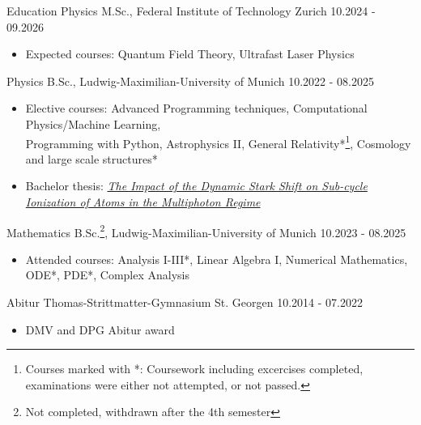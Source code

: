 \documentclass{resume}
\begin{document}
\begin{rSection}{Education}
    Physics M.Sc., Federal Institute of Technology Zurich \hfill 10.2024 - 09.2026
    \begin{itemize}\footnotesize
        \item Expected courses: Quantum Field Theory, Ultrafast Laser Physics
    \end{itemize}

    Physics B.Sc., Ludwig-Maximilian-University of Munich \hfill 10.2022 - 08.2025
    \begin{itemize}\footnotesize
        \item Elective courses: Advanced Programming techniques, Computational Physics/Machine Learning,\\Programming with Python, Astrophysics II, General Relativity*\footnote{Courses marked with *: Coursework including excercises completed, examinations were either not attempted, or not passed.}, Cosmology and large scale structures*
        \item Bachelor thesis: \textit{\href{https://doi.org/10.5281/zenodo.16223179}{The Impact of the Dynamic Stark Shift on Sub-cycle Ionization of Atoms in the Multiphoton Regime}}
    \end{itemize}

    Mathematics B.Sc.\footnote{Not completed, withdrawn after the 4th semester}, Ludwig-Maximilian-University of Munich \hfill 10.2023 - 08.2025
    \begin{itemize}\footnotesize
        \item Attended courses: Analysis I-III*, Linear Algebra I, Numerical Mathematics, \\ODE*, PDE*, Complex Analysis
    \end{itemize}

    Abitur Thomas-Strittmatter-Gymnasium St. Georgen \hfill 10.2014 - 07.2022
    \begin{itemize}\footnotesize
        \item DMV and DPG Abitur award
    \end{itemize}

\end{rSection}
\end{document}

